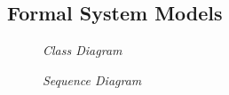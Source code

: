 \subsection{Formal System Models}
\label{appendix:models}

\begin{figure}[!ht]
\centering
{}
\caption{\em Class Diagram}
\end{figure}

\begin{figure}[!ht]
\centering
{}
\caption{\em Sequence Diagram}
\end{figure}

